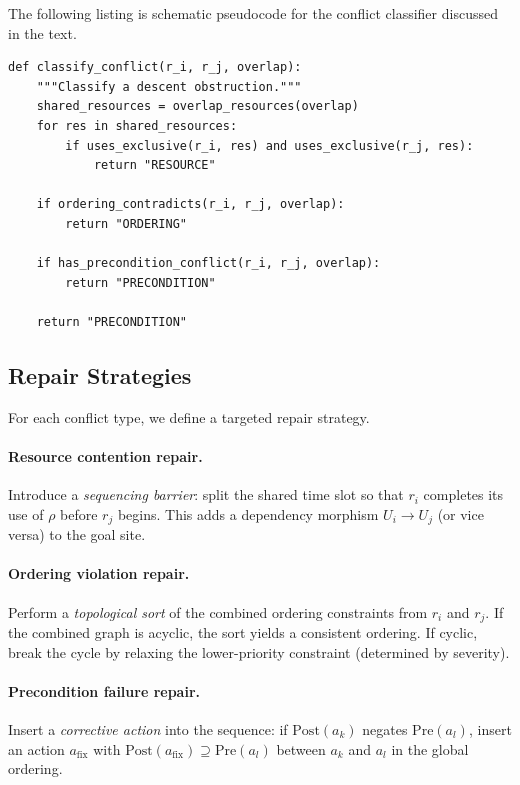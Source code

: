 \documentclass[11pt]{article}
\newcommand{\SubGoal}[1]{U_{#1}}
\newcommand{\PreCond}{\mathrm{Pre}}
\newcommand{\PostCond}{\mathrm{Post}}
\begin{document}
The following listing is schematic pseudocode for the conflict
classifier discussed in the text.

\begin{lstlisting}
def classify_conflict(r_i, r_j, overlap):
    """Classify a descent obstruction."""
    shared_resources = overlap_resources(overlap)
    for res in shared_resources:
        if uses_exclusive(r_i, res) and uses_exclusive(r_j, res):
            return "RESOURCE"

    if ordering_contradicts(r_i, r_j, overlap):
        return "ORDERING"

    if has_precondition_conflict(r_i, r_j, overlap):
        return "PRECONDITION"

    return "PRECONDITION"
\end{lstlisting}

\subsection{Repair Strategies}\label{ssec:repair-strat}

For each conflict type, we define a targeted repair strategy.

\paragraph{Resource contention repair.}
Introduce a \emph{sequencing barrier}: split the shared time slot
so that $r_i$ completes its use of $\rho$ before $r_j$ begins.
This adds a dependency morphism $\SubGoal{i} \to \SubGoal{j}$
(or vice versa) to the goal site.

\paragraph{Ordering violation repair.}
Perform a \emph{topological sort} of the combined ordering
constraints from $r_i$ and $r_j$.  If the combined graph is
acyclic, the sort yields a consistent ordering.  If cyclic,
break the cycle by relaxing the lower-priority constraint
(determined by severity).

\paragraph{Precondition failure repair.}
Insert a \emph{corrective action} into the sequence: if
$\PostCond(a_k)$ negates $\PreCond(a_l)$, insert an action
$a_{\mathrm{fix}}$ with $\PostCond(a_{\mathrm{fix}}) \supseteq
\PreCond(a_l)$ between $a_k$ and $a_l$ in the global ordering.
\end{document}
